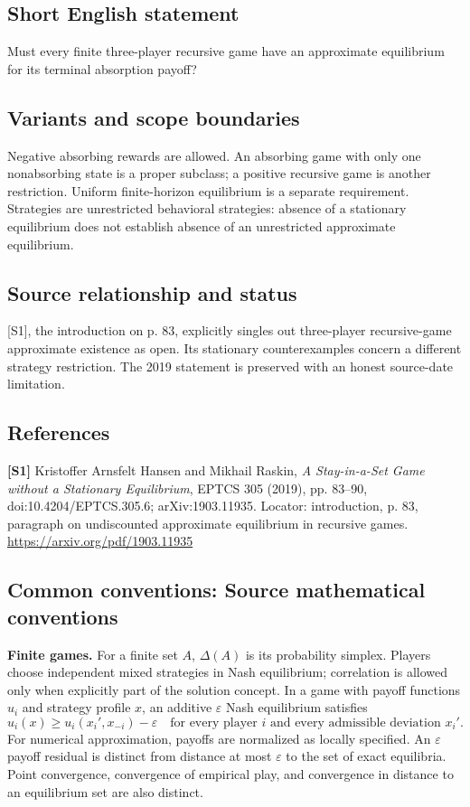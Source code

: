 \documentclass[11pt,a4paper]{article}
\begin{document}
\subsection*{Short English statement}
Must every finite three-player recursive game have an approximate equilibrium for its terminal absorption payoff?
\subsection*{Variants and scope boundaries}
Negative absorbing rewards are allowed. An absorbing game with only one nonabsorbing state is a proper subclass; a positive recursive game is another restriction. Uniform finite-horizon equilibrium is a separate requirement. Strategies are unrestricted behavioral strategies: absence of a stationary equilibrium does not establish absence of an unrestricted approximate equilibrium.
\subsection*{Source relationship and status}
[S1], the introduction on p. 83, explicitly singles out three-player recursive-game approximate existence as open. Its stationary counterexamples concern a different strategy restriction. The 2019 statement is preserved with an honest source-date limitation.
\subsection*{References}
\begingroup\footnotesize\raggedright
\textbf{[S1]} Kristoffer Arnsfelt Hansen and Mikhail Raskin, \emph{A Stay-in-a-Set Game without a Stationary Equilibrium}, EPTCS 305 (2019), pp. 83--90, doi:10.4204/EPTCS.305.6; arXiv:1903.11935. Locator: introduction, p. 83, paragraph on undiscounted approximate equilibrium in recursive games. \url{https://arxiv.org/pdf/1903.11935}
\par\endgroup

\subsection*{Common conventions: Source mathematical conventions}

\textbf{Finite games.} For a finite set $A$, $\Delta(A)$ is its probability
simplex. Players choose independent mixed strategies in Nash equilibrium;
correlation is allowed only when explicitly part of the solution concept.
In a game with payoff functions $u_i$ and strategy profile $x$, an additive
$\varepsilon$ Nash equilibrium satisfies
\[
 u_i(x)\geq u_i(x_i',x_{-i})-\varepsilon
 \quad\text{for every player $i$ and every admissible deviation $x_i'$}.
\]
For numerical approximation, payoffs are normalized as locally specified.
An $\varepsilon$ payoff residual is distinct from distance at most
$\varepsilon$ to the set of exact equilibria. Point convergence, convergence
of empirical play, and convergence in distance to an equilibrium set are
also distinct.
\end{document}

